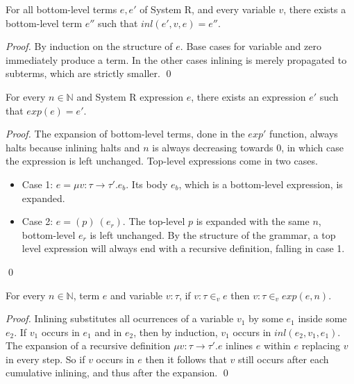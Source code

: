 \documentclass[runningheads]{llncs}
\newcommand{\tN}{\mathbb{N}}
\begin{document}
\begin{lemma}\label{lem:inl}
For all bottom-level terms $e, e'$ of System R,
and every variable $v$, there exists a bottom-level term 
$e''$ such that ${inl(e', v, e)=e''}$.\end{lemma}
\begin{proof}
By induction on the structure of $e$. Base cases for 
variable and zero immediately produce a term. In the 
other cases inlining is merely propagated to subterms, 
which are strictly smaller.  \qed
\end{proof}  

\begin{lemma}\label{lem:exp}
For every $n \in \tN$ and System R expression $e$, 
there exists an expression $e'$ such that 
$exp(e) = e'$.
\end{lemma}
\begin{proof}
The expansion of bottom-level terms, done in the $exp'$ 
function, always halts because inlining halts and $n$ is 
always decreasing towards $0$, in which case the 
expression is left unchanged. Top-level expressions come 
in two cases. 
\begin{itemize}
  \item Case 1: $e = \mu v : \tau \rightarrow \tau'.e_b$. Its 
  body $e_b$, which is a bottom-level expression, is 
  expanded.
  \item Case 2: $e = (p) \: (e_r)$. The top-level $p$ is expanded 
  with the same $n$, bottom-level $e_r$ is left unchanged. 
  By the structure of the grammar, a top level expression will 
  always end with a recursive definition, falling in case 1.
\end{itemize} 
 \qed
\end{proof}

\begin{lemma}\label{lem:pres}
For every $n \in \tN$, term $e$ and variable $v : \tau$, 
if $v : \tau \in_v e$ then $v : \tau \in_v exp(e, n)$.
\end{lemma}
\begin{proof}
Inlining substitutes all ocurrences of a variable $v_1$ by 
some 
$e_1$ inside some $e_2$. If $v_1$ occurs in $e_1$ and in 
$e_2$, then by 
induction, $v_1$ occurs in $inl(e_2, v_1, e_1)$.
The expansion of a recursive definition 
$\mu v : \tau \rightarrow \tau'.e$ inlines $e$ within 
$e$ replacing 
$v$ in every step. So if $v$ occurs in $e$ then it follows 
that $v$ still occurs after each cumulative inlining, 
and thus after the expansion. \qed
\end{proof}
\end{document}
